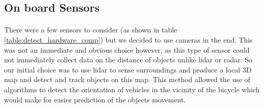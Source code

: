 \documentclass[a4paper]{report}
\begin{document}
\subsection{On board Sensors}
\paragraph{} There were a few sensors to consider (as shown in table \ref{table:detect_hardware_comp}) but we decided to use cameras in the end. This was not an immediate and obvious choice however, as this type of sensor could not immediately collect data on the distance of objects unlike lidar or radar. So our initial choice was to use lidar to sense surroundings and produce a local 3D map and detect and track objects on this map. This method allowed the use of algorithms to detect the orientation of vehicles in the vicinity of the bicycle which would make for easier prediction of the objects movement.
\end{document}
